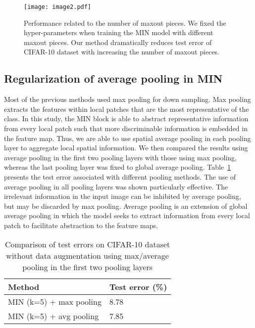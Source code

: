 \documentclass[10pt,twocolumn,letterpaper]{article}
\begin{document}
\begin{figure}
\begin{center}
	\texttt{[image: image2.pdf]}
\end{center}
   \caption{Performance related to the number of maxout pieces. We fixed the hyper-parameters when training the MIN model with different maxout pieces. Our method dramatically reduces test error of CIFAR-10 dataset with increasing the number of maxout pieces.}
\label{fig:comfig}
\end{figure}

\subsection{Regularization of average pooling in MIN}
	Most of the previous methods used max pooling for down sampling. Max pooling extracts the features within local patches that are the most representative of the class.  In this study, the MIN block is able to abstract representative information from every local patch such that more discriminable information is embedded in the feature map. Thus, we are able to use spatial average pooling in each pooling layer to aggregate local spatial information. We then compared the results using average pooling in the first two pooling layers with those using max pooling, whereas the last pooling layer was fixed to global average pooling. Table~\ref{tab:avg} presents the test error associated with different pooling methods. The use of average pooling in all pooling layers was shown particularly effective. The irrelevant information in the input image can be inhibited by average pooling, but may be discarded by max pooling.  Average pooling is an extension of global average pooling in which the model seeks to extract information from every local patch to facilitate abstraction to the feature maps.

\begin{table}
\begin{center}
\caption{Comparison of test errors on CIFAR-10 dataset without data augmentation using max/average pooling in the first two pooling layers}
\begin{tabular}{|p{1.8in}|p{0.8in}|} \hline 
Method & Test error (\%) \\ \hline 
MIN (k=5)  + max pooling & 8.78 \\ \hline 
MIN (k=5)  + avg pooling & 7.85 \\ \hline 
\end{tabular}
\label{tab:avg}
\end{center}
\end{table}
\end{document}
